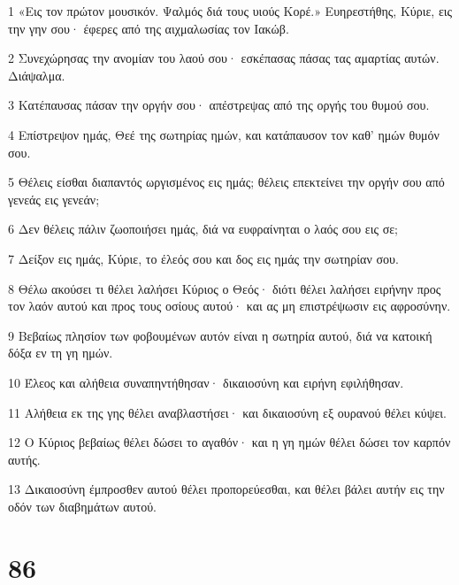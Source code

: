 \par 1 «Εις τον πρώτον μουσικόν. Ψαλμός διά τους υιούς Κορέ.» Ευηρεστήθης, Κύριε, εις την γην σου· έφερες από της αιχμαλωσίας τον Ιακώβ.
\par 2 Συνεχώρησας την ανομίαν του λαού σου· εσκέπασας πάσας τας αμαρτίας αυτών. Διάψαλμα.
\par 3 Κατέπαυσας πάσαν την οργήν σου· απέστρεψας από της οργής του θυμού σου.
\par 4 Επίστρεψον ημάς, Θεέ της σωτηρίας ημών, και κατάπαυσον τον καθ' ημών θυμόν σου.
\par 5 Θέλεις είσθαι διαπαντός ωργισμένος εις ημάς; θέλεις επεκτείνει την οργήν σου από γενεάς εις γενεάν;
\par 6 Δεν θέλεις πάλιν ζωοποιήσει ημάς, διά να ευφραίνηται ο λαός σου εις σε;
\par 7 Δείξον εις ημάς, Κύριε, το έλεός σου και δος εις ημάς την σωτηρίαν σου.
\par 8 Θέλω ακούσει τι θέλει λαλήσει Κύριος ο Θεός· διότι θέλει λαλήσει ειρήνην προς τον λαόν αυτού και προς τους οσίους αυτού· και ας μη επιστρέψωσιν εις αφροσύνην.
\par 9 Βεβαίως πλησίον των φοβουμένων αυτόν είναι η σωτηρία αυτού, διά να κατοική δόξα εν τη γη ημών.
\par 10 Έλεος και αλήθεια συναπηντήθησαν· δικαιοσύνη και ειρήνη εφιλήθησαν.
\par 11 Αλήθεια εκ της γης θέλει αναβλαστήσει· και δικαιοσύνη εξ ουρανού θέλει κύψει.
\par 12 Ο Κύριος βεβαίως θέλει δώσει το αγαθόν· και η γη ημών θέλει δώσει τον καρπόν αυτής.
\par 13 Δικαιοσύνη έμπροσθεν αυτού θέλει προπορεύεσθαι, και θέλει βάλει αυτήν εις την οδόν των διαβημάτων αυτού.

\chapter{86}

